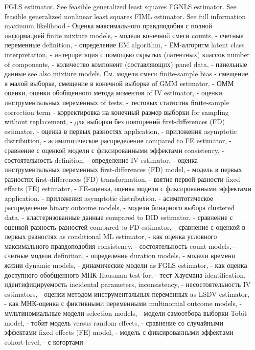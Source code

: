 FGLS estimator. See feasible generalized least squares FGNLS estimator. See feasible generalized nonlinear least squares
FIML estimator. See full information maximum likelihood - Оценка максимального правдподобия с полной информацией
finite mixture models, - модели конечной смеси
counts, - счетные переменные
definition, - определение
EM algorithm, - ЕМ-алгоритм
latent class interpretation, - интерпретация с помощью скрытых (латентных) классов
number of components, - количество компонент (составляющих)
panel data, - панельные данные
see also mixture models. См. модели смеси
finite-sample bias - смещение в малой выборке, смещение в конечной выборке
of GMM estimator, - ОММ оценки, оценки обобщенного метода моментов
of IV estimator, - оценки инструментальных переменных
of tests, - тестовых статистик
finite-sample correction term - корректировка на конечный размер выборки
for sampling without replacement, - для выборки без повторений
first-differences (FD) estimator, - оценка в первых разностях
application, - приложения
asymptotic distribution, - асимптотическое распределение
compared to FE estimator, - сравнение с оценкой модели с фиксированными эффектами
consistency, - состоятельность
definition, - определение
IV estimator, - оценка инструментальных переменных
first-differences (FD) model, - модель в первых разностях
first-differences (FD) transformation, - взятие первой разности
fixed effects (FE) estimator, - FE-оценка, оценка модели с фиксированными эффектами
application, - приложения
asymptotic distribution, - асимптотическое распределение
binary outcome models, - модели бинарного выбора
clustered data, - кластеризованные данные
compared to DID estimator, - сравнение с оценкой разность-разностей
compared to FD estimator, - сравнение с оценкой в первых разностях
as conditional ML estimator, - как оценка условного максимального правдоподобия
consistency, - состоятельность
count models, - счетные модели
definition, - определение
duration models, - модели времени жизни
dynamic models, - динамические модели
as FGLS estimator, - как оценка доступного обобщенного МНК
Hausman test for, - тест Хаусмана
identification, - идентифицируемость
incidental parameters,
inconsistency, - несостоятельность
IV estimators, - оценки методом инструментальных переменных
as LSDV estimator, - как МНК-оценка с фиктивными переменными 
multinomial outcome models, - мультиномиальные модели
selection models, - модели самоотбора выборки
Tobit model, - тобит модель
versus random effects, - сравнение со случайными эффектами
fixed effects (FE) model, - модель с фиксированными эффектами
cohort-level, - с когортами
